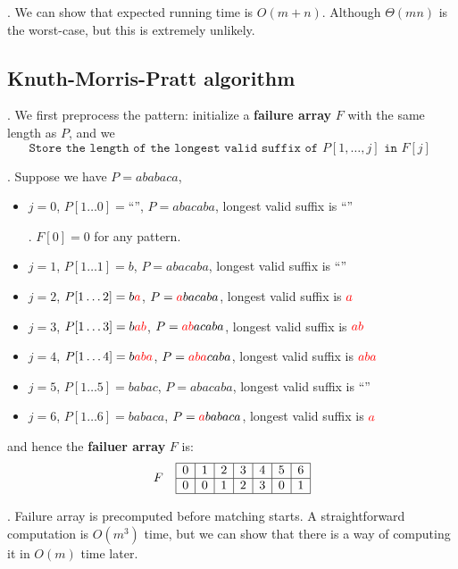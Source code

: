 \documentclass{article}
\begin{document}
\begin{result}[].
    We can show that expected running time is $O(m + n)$. Although $\Theta(mn)$ is the worst-case, but this is extremely unlikely. 
\end{result}

\subsection{Knuth-Morris-Pratt algorithm} 

\begin{algo}[].
    We first preprocess the pattern: initialize a \textbf{failure  array} $F$ with the same length as $P$, and we 
    \[ \texttt{ Store the length of the longest valid suffix of $P[1, \ldots, j]$ in $F[j]$ } \]

    \begin{examplee}[].
        Suppose we have $P = ababaca$, \begin{itemize}
            \item $j = 0$, $P[1\dots0] = \text{``''}$, $P = abacaba$, longest valid suffix is $\text{``''}$
            \begin{comm}[].
                $F[0] = 0$ for any pattern. 
            \end{comm}
            \item $j = 1$, $P[1\dots1] = b$, $P = abacaba$, longest valid suffix is $\text{``''}$
            \item $j = 2$, $P[1\dots2] = b\textcolor{red}{a}$, $P = \textcolor{red}{a}bacaba$, longest valid suffix is $\textcolor{red}{a}$
            \item $j = 3$, $P[1\dots3] = b\textcolor{red}{ab}$, $P = \textcolor{red}{ab}acaba$, longest valid suffix is $\textcolor{red}{ab}$
            \item $j = 4$, $P[1\dots4] = b\textcolor{red}{aba}$, $P = \textcolor{red}{aba}caba$, longest valid suffix is $\textcolor{red}{aba}$
            \item $j = 5$, $P[1\dots5] = babac$, $P = abacaba$, longest valid suffix is $\text{``''}$
            \item $j = 6$, $P[1\dots6] = babaca$, $P = \textcolor{red}{a}babaca$, longest valid suffix is $\textcolor{red}{a}$
        \end{itemize}
        and hence the \textbf{failuer array} $F$ is: 
        \[
            F \quad \begin{array}{|c|c|c|c|c|c|c|}
                \hline
                0 & 1 & 2 & 3 & 4 & 5 & 6 \\ \hline
                0 & 0 & 1 & 2 & 3 & 0 & 1 \\ \hline
                \end{array}
        \]
    \end{examplee}
    \begin{discovery}[].
        Failure array is precomputed before matching starts. A straightforward computation is $O(m^3)$ time, but we can show that there is a way of computing it in $O(m)$ time later. 
    \end{discovery}
\end{algo}
\end{document}

